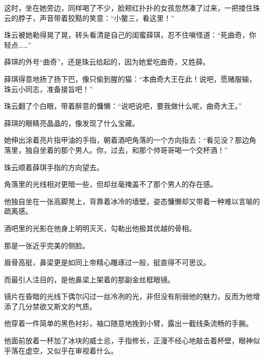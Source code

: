 \documentclass[12pt,a4paper]{article}
\begin{document}
这时，坐在她旁边，同样喝了不少，脸颊红扑扑的女孩忽然凑了过来，一把搂住珠云的脖子，声音带着狡黠的笑意：“小鳖三，看这里！”



珠云被她勒得晃了晃，转头看清是自己的闺蜜薛琪，忍不住嗔怪道：“死曲奇，你轻点……”



薛琪的外号“曲奇”，还是珠云给起的，因为她爱吃曲奇，又姓薛。



薛琪得意地扬了扬下巴，像只偷到腥的猫：“本曲奇大王在此！说吧，愿赌服输，珠云小同志，准备接旨吧！”



珠云翻了个白眼，带着醉意的慵懒：“说吧说吧，要我做什么呢，曲奇大王。”



薛琪的眼睛亮晶晶的，像发现了什么宝藏。



她伸出涂着亮片指甲油的手指，朝着酒吧角落的一个方向指去：“看见没？那边角落里，独自坐着的那个男人。你，过去，和那个帅哥哥喝一个交杯酒！”



珠云顺着薛琪手指的方向望去。



角落里的光线相对更暗一些，但却丝毫掩盖不了那个男人的存在感。



他独自坐在一张高脚凳上，背靠着冰冷的墙壁，姿态慵懒却又带着一种难以言喻的疏离感。



酒吧里的光影在他身上明明灭灭，勾勒出他极其优越的骨相。



那是一张近乎完美的侧脸。



眉骨高挺，鼻梁更是如同上帝精心雕琢过一般，挺直得不可思议。



而最引人注目的，是他鼻梁上架着的那副金丝框眼镜。



镜片在昏暗的光线下偶尔闪过一丝冷冽的光，非但没有削弱他的魅力，反而为他增添了几分禁欲又斯文的气质。



他穿着一件简单的黑色衬衫，袖口随意地挽到小臂，露出一截线条流畅的手腕。



他面前放着一杯加了冰块的威士忌，手指修长，正漫不经心地敲击着杯壁，眼神似乎落在虚空，又似乎在审视着什么。
\end{document}
